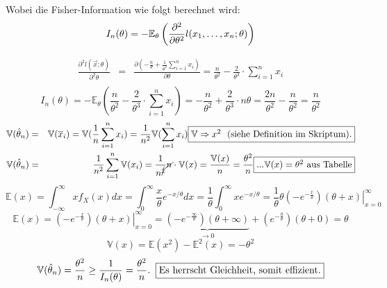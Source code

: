 \begin{uebsp}
\begin{Answer}
\begin{enumerate}[i)]
\begin{uebsp_theory}
            Wobei die Fisher-Information wie folgt berechnet wird:
            \[I_n(\theta)=-\mathbb E_\theta\left({\partial^2\over\partial\theta^2}l(x_1,\dots,x_n;\theta)\right)\]
        \end{uebsp_theory}
        \begin{eqnarray*}
            \frac{\partial^2 l(\vec x;\theta)}{\partial^2\theta}&=&\frac{\partial\left(-\frac{n}{\theta} +\frac{1}{\theta^2}\sum_{i=1}^{n}x_i\right)}{\partial\theta}=\frac{n}{\theta^2}-\frac{2}{\theta^3}\cdot\sum_{i=1}^nx_i\\
        \end{eqnarray*}
        \[I_n(\theta)=-\mathbb E_\theta\left(\frac{n}{\theta^2}-\frac{2}{\theta^3}\cdot\sum_{i=1}^nx_i\right)=-\frac{n}{\theta^2}+\frac{2}{\theta^3}\cdot n\theta=\frac{2n}{\theta^2}-\frac{n}{\theta^2}=\frac{n}{\theta^2}\]
    \begin{eqnarray*}\mathbb V(\hat\theta_n)&=&\mathbb V(\overline x_i)=\mathbb V(\frac{1}{n}\sum_{i=1}^nx_i)=\frac{1}{n^2}\mathbb V(\sum_{i=1}^nx_i)\framebox{$\mathbb V\Rightarrow x^2$ \reference{}{Definition}{def:varianz_eigenschaften}.}\\
        \mathbb V(\hat\theta_n) &=& \frac{1}{n^2}\sum_{i=1}^n\mathbb V(x_i)=\frac{1}{n^{\cancel2}}\cancel n\cdot\mathbb V(x)=\frac{\mathbb V(x)}{n}=\frac{\theta^2}{n}\framebox{...$\mathbb V(x)=\theta^2$ aus Tabelle}
    \end{eqnarray*}
    \[\mathbb E(x)=\int_{-\infty}^\infty xf_X(x)dx=\int_{0}^\infty\frac{x}{\theta}e^{-x/\theta}dx=\frac{1}{\theta}\int_{0}^\infty x e^{-x/\theta}=\frac{1}{\theta}\left.\theta\left(-e^{-\frac{x}{\theta}}\right)(\theta+x)\right|_{x=0}^\infty\]
    \[\mathbb E(x)=\left.\left(-e^{-\frac{x}{\theta}}\right)(\theta+x)\right|_{x=0}^\infty=\underbrace{\left(-e^{-\frac{\infty}{\theta}}\right)(\theta+\infty)}_{\rightarrow0}+\left(e^{-\frac{0}{\theta}}\right)(\theta+0)=\theta\]
    \[\mathbb V(x)=\mathbb{E}(x^2)-\mathbb{E}^2(x)=-\theta^2\]
    \[\mathbb V(\hat\theta_n)=\frac{\theta^2}{n}\ge \frac{1}{I_n(\theta)}={\frac{\theta^2}{n}}.\;\;\framebox{Es herrscht Gleichheit, somit effizient.}\]

\end{enumerate}
   
\end{Answer}
\end{uebsp}
